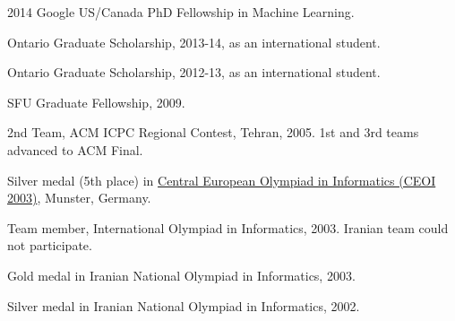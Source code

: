 \documentclass[10pt,letterpaper]{article}
\renewenvironment{itemize}{
  \begin{list}{}{
    \setlength{\leftmargin}{1.5em}
  }
}{
  \end{list}
}
\begin{document}
\begin{itemize}
\item 2014 Google US/Canada PhD Fellowship in Machine Learning.
\item Ontario Graduate Scholarship, 2013-14, as an international student.
\item Ontario Graduate Scholarship, 2012-13, as an international student.
\item SFU Graduate Fellowship, 2009.
\item 2nd Team, ACM ICPC Regional Contest, Tehran, 2005. 1st and 3rd teams advanced to ACM Final.
\item Silver medal (5th place) in \href{http://www.ceoi2003.de/www/}{Central European Olympiad in Informatics (CEOI 2003)}, Munster, Germany.
\item Team member, International Olympiad in Informatics, 2003. Iranian team could not participate.
\item Gold medal in Iranian National Olympiad in Informatics, 2003.
\item Silver medal in Iranian National Olympiad in Informatics, 2002.
\end{itemize}


\end{document}
